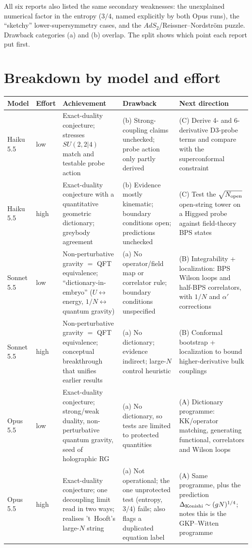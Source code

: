 \documentclass[11pt]{article}
\begin{document}
All six reports also listed the same secondary weaknesses: the unexplained numerical factor in the entropy ($3/4$, named explicitly by both Opus runs), the ``sketchy'' lower-supersymmetry cases, and the $AdS_2$/Reissner--Nordstr\"om puzzle. Drawback categories (a) and (b) overlap. The split shows which point each report put first.

\section*{Breakdown by model and effort}

\begin{center}
\small
\begin{tabularx}{\textwidth}{l l L L L}
\toprule
Model & Effort & Achievement & Drawback & Next direction \\
\midrule
Haiku 5.5 & low & Exact-duality conjecture; stresses $SU(2,2|4)$ match and testable probe action & (b) Strong-coupling claims unchecked; probe action only partly derived & (C) Derive 4- and 6-derivative D3-probe terms and compare with the superconformal constraint \\
Haiku 5.5 & high & Exact-duality conjecture with a quantitative geometric dictionary; greybody agreement & (b) Evidence mostly kinematic; boundary conditions open; predictions unchecked & (C) Test the $\sqrt{N_{\rm open}}$ open-string tower on a Higgsed probe against field-theory BPS states \\
\midrule
Sonnet 5.5 & low & Non-perturbative gravity $=$ QFT equivalence; ``dictionary-in-embryo'' ($U\leftrightarrow$ energy, $1/N\leftrightarrow$ quantum gravity) & (a) No operator/field map or correlator rule; boundary conditions unspecified & (B) Integrability + localization: BPS Wilson loops and half-BPS correlators, with $1/N$ and $\alpha'$ corrections \\
Sonnet 5.5 & high & Non-perturbative gravity $=$ QFT equivalence; conceptual breakthrough that unifies earlier results & (a) No dictionary; evidence indirect; large-$N$ control heuristic & (B) Conformal bootstrap + localization to bound higher-derivative bulk couplings \\
\midrule
Opus 5.5 & low & Exact-duality conjecture; strong/weak duality, non-perturbative quantum gravity, seed of holographic RG & (a) No dictionary, so tests are limited to protected quantities & (A) Dictionary programme: KK/operator matching, generating functional, correlators and Wilson loops \\
Opus 5.5 & high & Exact-duality conjecture; one decoupling limit read in two ways; realises 't~Hooft's large-$N$ string & (a) Not operational; the one unprotected test (entropy, $3/4$) fails; also flags a duplicated equation label & (A) Same programme, plus the prediction $\Delta_{\rm Konishi}\sim(gN)^{1/4}$; notes this is the GKP--Witten programme \\
\bottomrule
\end{tabularx}
\end{center}
\end{document}
